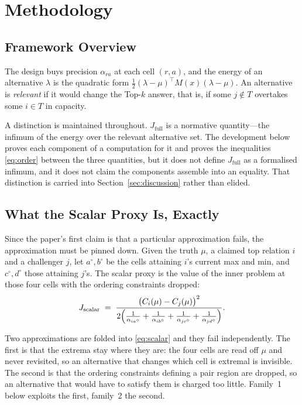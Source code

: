 \section{Methodology}
\label{sec:setting}

\subsection{Framework Overview}

The design buys precision $\alpha_{ra}$ at each cell $(r,a)$, and the energy of an
alternative $\lambda$ is the quadratic form
$\tfrac12(\lambda-\mu)^{\top}M(x)(\lambda-\mu)$. An alternative is \emph{relevant} if it
would change the Top-$k$ answer, that is, if some $j\notin T$ overtakes some $i\in T$ in
capacity.

A distinction is maintained throughout. $J_{\mathrm{full}}$ is a normative quantity---the
infimum of the energy over the relevant alternative set. The development below proves each
component of a computation for it and proves the inequalities \eqref{eq:order} between the
three quantities, but it does not define $J_{\mathrm{full}}$ as a formalised infimum, and it
does not claim the components assemble into an equality. That distinction is carried into
Section~\ref{sec:discussion} rather than elided.

\subsection{What the Scalar Proxy Is, Exactly}
\label{sec:proxydef}

Since the paper's first claim is that a particular approximation fails, the approximation
must be pinned down. Given the truth $\mu$, a claimed top relation $i$ and a challenger $j$,
let $a^{\circ},b^{\circ}$ be the cells attaining $i$'s current max and min, and
$c^{\circ},d^{\circ}$ those attaining $j$'s. The scalar proxy is the value of the inner
problem at those four cells with the ordering constraints dropped:
\begin{equation}
J_{\mathrm{scalar}}
\;=\;
\frac{\bigl(C_{i}(\mu)-C_{j}(\mu)\bigr)^{2}}
     {2\Bigl(\frac{1}{\alpha_{ia^{\circ}}}+\frac{1}{\alpha_{ib^{\circ}}}
            +\frac{1}{\alpha_{jc^{\circ}}}+\frac{1}{\alpha_{jd^{\circ}}}\Bigr)} .
\label{eq:scalar}
\end{equation}

Two approximations are folded into \eqref{eq:scalar} and they fail independently. The first
is that the extrema stay where they are: the four cells are read off $\mu$ and never
revisited, so an alternative that changes which cell is extremal is invisible. The second is
that the ordering constraints defining a pair region are dropped, so an alternative that
would have to satisfy them is charged too little. Family~1 below exploits the first, family~2
the second.

